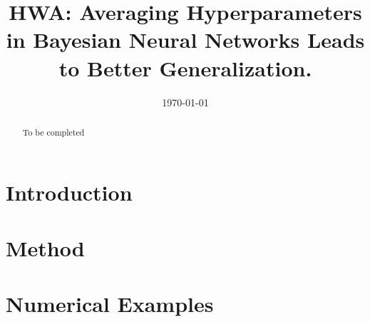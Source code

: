 \documentclass[11pt]{article}
\theoremstyle{t}
\begin{document}
\title{HWA: Averaging Hyperparameters in Bayesian Neural Networks Leads to Better Generalization.}
\date{\today}

\maketitle

\begin{abstract}
To be completed
\end{abstract}

\section{Introduction}

\section{Method}

\section{Numerical Examples}

\newpage






\end{document}
